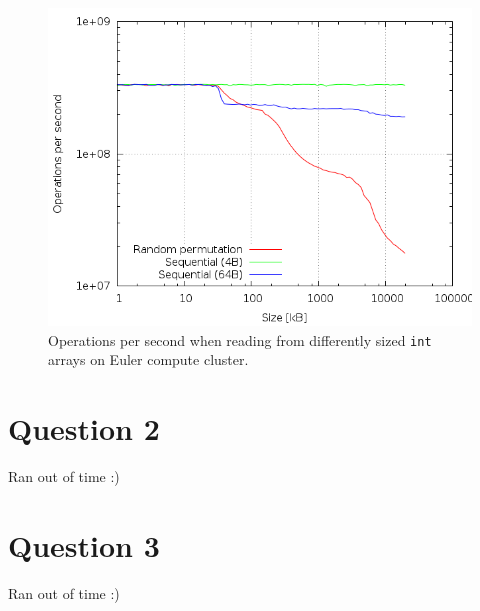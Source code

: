 \documentclass[11pt,a4paper]{article}
\begin{document}
\begin{figure}[ht]
\begin{center}
\includegraphics[scale=0.5]{./1_cache_size/results.png} 
\end{center}
\caption{Operations per second when reading from differently sized \texttt{int} arrays on Euler compute cluster.}
\label{fig:1}
\end{figure}




\section{Question 2}

Ran out of time :)

\section{Question 3}

Ran out of time :)
\end{document}
